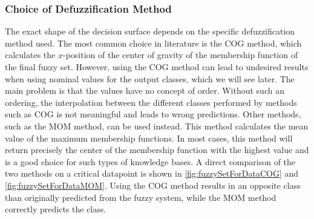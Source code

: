 \subsubsection{Choice of Defuzzification Method}

The exact shape of the decision surface depends on the specific defuzzification method used. The most common choice in literature is the COG method, which calculates the $x$-position of the center of gravity of the membership function of the final fuzzy set.
However, using the COG method can lead to undesired results when using nominal values for the output classes, which we will see later. The main problem is that the values have no concept of order. Without such an ordering, the interpolation between the different classes performed by methods such as COG is not meaningful and leads to wrong predictions. Other methods, such as the MOM method, can be used instead. This method calculates the mean value of the maximum membership functions. In most cases, this method will return precisely the center of the membership function with the highest value and is a good choice for such types of knowledge bases. A direct comparison of the two methods on a critical datapoint is shown in \autoref{fig:fuzzySetForDataCOG} and \autoref{fig:fuzzySetForDataMOM}. Using the COG method results in an opposite class than originally predicted from the fuzzy system, while the MOM method correctly predicts the class.


